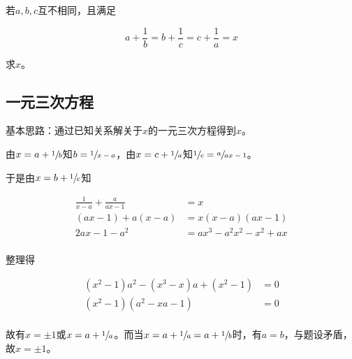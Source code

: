 

若$a, b, c$互不相同，且满足

\[ a + \frac1b = b + \frac1c = c + \frac1a = x \]

求$x$。


\subsection{一元三次方程}

基本思路：通过已知关系解关于$x$的一元三次方程得到$x$。

由$x = a + \sfrac1b$知$b = \sfrac1{x - a}$，由$x = c + \sfrac1a$知$\sfrac1c = \sfrac a{ax - 1}$。

于是由$x = b + \sfrac1c$知

\begin{align*}
  \frac1{x - a} + \frac a{ax - 1} &= x \\
  (ax - 1) + a(x - a) &= x(x - a)(ax - 1) \\
  2ax - 1 - a^2 &= ax^3 - a^2x^2 - x^2 + ax \\
\end{align*}

整理得

\begin{align*}
  (x^2 - 1)a^2 - (x^3 - x)a + (x^2 - 1) &= 0 \\
  (x^2 - 1)(a^2 - xa - 1) &= 0 \\
\end{align*}

故有$x = \pm1$或$x = a + \sfrac1a$。而当$x = a + \sfrac1a = a + \sfrac1b$时，有$a = b$，与题设矛盾，故$x = \pm1$。
